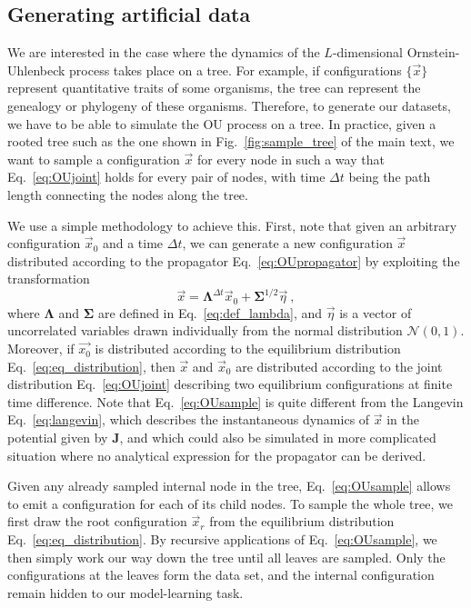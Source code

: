 \documentclass[preprint,amsmath,amssymb,superscriptaddress,showpacs,pre]{revtex4-1}
\def\vx{\vec x}
\newcommand{\Lam}{\bm{\Lambda}}
\newcommand{\Sig}{\bm{\Sigma}}
\begin{document}
\subsection{Generating artificial data} %
\label{sub:generating_artificial_data}

We are interested in the case where the dynamics of the $L$-dimensional Ornstein-Uhlenbeck process takes place on a tree. For example, if configurations $\{\vec{x}\}$ represent quantitative traits of some organisms, the tree can represent the genealogy or phylogeny of these organisms. Therefore, to generate our datasets, we have to be able to simulate the OU process on a tree. In practice, given a rooted tree such as the one shown in Fig.~\ref{fig:sample_tree}  of the main text, we want to sample a configuration $\vec{x}$ for every node in such a way that Eq.~\eqref{eq:OUjoint} holds for every pair of nodes, with time $\Delta t$ being the path length connecting the nodes along the tree. 
	
We use a simple methodology to achieve this. First, note that given an arbitrary configuration $\vec{x}_0$ and a time $\Delta t$, we can generate a new configuration $\vec{x}$ distributed according to the propagator Eq.~\eqref{eq:OUpropagator} by exploiting the transformation
\begin{equation}
	\vx = \Lam^{\Delta t}\vx_0 + \Sig^{1/2}\vec{\eta}\ ,
	\label{eq:OUsample}
\end{equation}
where $\Lam$ and $\Sig$ are defined in Eq.~\eqref{eq:def_lambda}, and $\vec{\eta}$ is a vector of uncorrelated variables drawn individually from the normal distribution $\mathcal{N}(0,1)$. Moreover, if $\vec{x_0}$ is distributed according to the equilibrium distribution Eq.~\eqref{eq:eq_distribution}, then $\vx$ and $\vx_0$ are distributed according to the joint distribution Eq.~\eqref{eq:OUjoint} describing two equilibrium configurations at finite time difference. Note that Eq.~\eqref{eq:OUsample} is quite different from the Langevin Eq.~\eqref{eq:langevin}, which describes the instantaneous dynamics of  $\vx$ in the potential given by $\bm{J}$, and which could also be simulated in more complicated situation where no analytical expression for the propagator can be derived. 
	
Given any already sampled internal node in the tree, Eq.~\eqref{eq:OUsample} allows to emit a configuration for each of its child nodes. To sample the whole tree, we first draw the root configuration $\vx_r$ from the equilibrium distribution Eq.~\eqref{eq:eq_distribution}. By recursive applications of Eq.~\eqref{eq:OUsample}, we then simply work our way down the tree until all leaves are sampled. Only the configurations at the leaves form the data set, and the internal configuration remain hidden to our model-learning task.  
\end{document}

